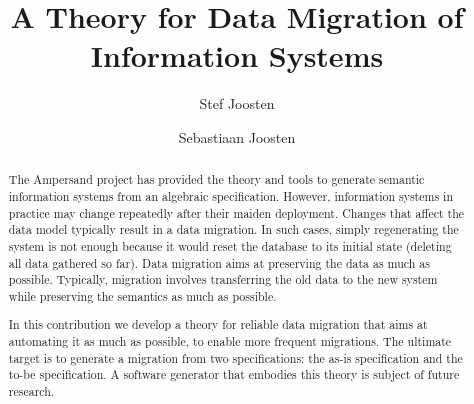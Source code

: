\documentclass{elsarticle}
\begin{document}







\title{A Theory for Data Migration of Information Systems}
\author[ou,ordina]{Stef Joosten}
\author[umn]{Sebastiaan Joosten}
\address[ou]{Open Universiteit Nederland, Heerlen, the Netherlands}
\address[ordina]{Ordina NV, Nieuwegein, the Netherlands}
\address[umn]{University of Minnesota, Minneapolis, USA}

\begin{abstract}
   The Ampersand project has provided the theory and tools to generate semantic information systems from an algebraic specification.
   However, information systems in practice may change repeatedly after their maiden deployment.
   Changes that affect the data model typically result in a data migration.
   In such cases, simply regenerating the system is not enough because it would reset the database to its initial state (deleting all data gathered so far).
   Data migration aims at preserving the data as much as possible.
   Typically, migration involves transferring the old data to the new system while preserving the semantics as much as possible.

   In this contribution we develop a theory for reliable data migration that aims at automating it as much as possible,
   to enable more frequent migrations.
   The ultimate target is to generate a migration from two specifications: the as-is specification and the to-be specification.
   A software generator that embodies this theory is subject of future research.
\end{abstract}
\end{document}

